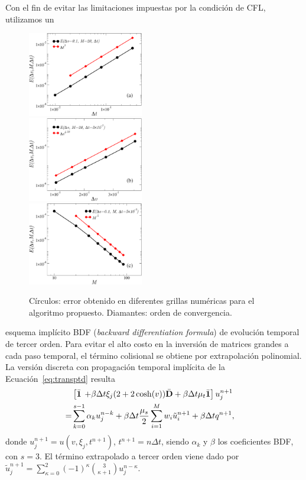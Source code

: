 Con el fin de evitar las
limitaciones impuestas por la condición de CFL, utilizamos un 
\begin{figure}
  \includegraphics[width=0.45\textwidth]{figuras/errdt.pdf}\\
  \vspace{2mm}
  \includegraphics[width=0.45\textwidth]{figuras/errdx.pdf}\\
  \vspace{2mm}
  \includegraphics[width=0.45\textwidth]{figuras/xiconv.pdf}
  \caption{Círculos: error obtenido en diferentes grillas numéricas para el algoritmo 
  propuesto. Diamantes: orden de convergencia.}
 \label{fig:conv}
\end{figure}
esquema implícito BDF ({\em backward differentiation formula}) de evolución temporal de tercer orden. 
Para evitar el alto costo en la inversión de matrices grandes a 
cada paso 
temporal, el término 
colisional se obtiene por extrapolación polinomial. La versión discreta con propagación temporal 
implícita de la Ecuación~\eqref{eq:transptd} resulta
\begin{equation*}
\begin{aligned}
& \left[ \bar{\mathbf{1}} \right.  \left.+ \beta\Delta t\xi_j (2+2\cosh(v)) \bar{\mathbf{D}} + \beta\Delta t \mu_t \bar{\mathbf{1}} \right]  
 u^{n+1}_j &\\ = & \sum_{k=0}^{s-1}\alpha_k u_j^{n-k} + \beta\Delta t \frac{\mu_s}{2}
 \sum_{i=1}^{M} w_i \tilde{u}_i^{n+1} + \beta\Delta t q^{n+1},
\end{aligned}
\label{eq:transptd1disc}
\end{equation*}
donde $u^{n+1}_j=u(v,\xi_j,t^{n+1})$, $t^{n+1}=n\Delta t$, siendo $\alpha_k$ y $\beta$ 
los coeficientes BDF, con $s=3$. 
El término extrapolado 
a tercer orden viene dado por $\tilde{u}_j^{n+1}=\sum_{\kappa=0}^{2}(-1)^\kappa {3 \choose \kappa+1} u_j^{n-\kappa}$.


